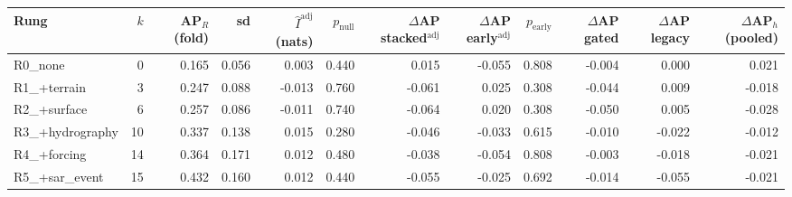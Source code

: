 \begin{tabular}{lrrrrrrrrrrr}
\toprule
Rung & $k$ & AP$_R$ (fold) & sd & $\hat I^{\mathrm{adj}}$ (nats) & $p_{\mathrm{null}}$ & $\Delta$AP stacked$^{\mathrm{adj}}$ & $\Delta$AP early$^{\mathrm{adj}}$ & $p_{\mathrm{early}}$ & $\Delta$AP gated & $\Delta$AP legacy & $\Delta$AP$_h$ (pooled) \\
\midrule
R0\_none & 0 & 0.165 & 0.056 & 0.003 & 0.440 & 0.015 & -0.055 & 0.808 & -0.004 & 0.000 & 0.021 \\
R1\_+terrain & 3 & 0.247 & 0.088 & -0.013 & 0.760 & -0.061 & 0.025 & 0.308 & -0.044 & 0.009 & -0.018 \\
R2\_+surface & 6 & 0.257 & 0.086 & -0.011 & 0.740 & -0.064 & 0.020 & 0.308 & -0.050 & 0.005 & -0.028 \\
R3\_+hydrography & 10 & 0.337 & 0.138 & 0.015 & 0.280 & -0.046 & -0.033 & 0.615 & -0.010 & -0.022 & -0.012 \\
R4\_+forcing & 14 & 0.364 & 0.171 & 0.012 & 0.480 & -0.038 & -0.054 & 0.808 & -0.003 & -0.018 & -0.021 \\
R5\_+sar\_event & 15 & 0.432 & 0.160 & 0.012 & 0.440 & -0.055 & -0.025 & 0.692 & -0.014 & -0.055 & -0.021 \\
\bottomrule
\end{tabular}
